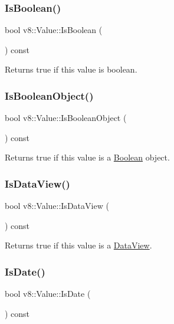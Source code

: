 \subsubsection{\texorpdfstring{Is\+Boolean()}{IsBoolean()}}
{\footnotesize\ttfamily bool v8\+::\+Value\+::\+Is\+Boolean (\begin{DoxyParamCaption}{ }\end{DoxyParamCaption}) const}

Returns true if this value is boolean. \mbox{\label{classv8_1_1Value_a4cc64a2761fa8ed852007a2c35ecde8a}} 
\subsubsection{\texorpdfstring{Is\+Boolean\+Object()}{IsBooleanObject()}}
{\footnotesize\ttfamily bool v8\+::\+Value\+::\+Is\+Boolean\+Object (\begin{DoxyParamCaption}{ }\end{DoxyParamCaption}) const}

Returns true if this value is a \mbox{\hyperlink{classv8_1_1Boolean}{Boolean}} object. \mbox{\label{classv8_1_1Value_ad854ff95b445e924a4d78b1b1dc8054b}} 
\subsubsection{\texorpdfstring{Is\+Data\+View()}{IsDataView()}}
{\footnotesize\ttfamily bool v8\+::\+Value\+::\+Is\+Data\+View (\begin{DoxyParamCaption}{ }\end{DoxyParamCaption}) const}

Returns true if this value is a \mbox{\hyperlink{classv8_1_1DataView}{Data\+View}}. \mbox{\label{classv8_1_1Value_aa94f94744aed4d5e731eacf52c8b4801}} 
\subsubsection{\texorpdfstring{Is\+Date()}{IsDate()}}
{\footnotesize\ttfamily bool v8\+::\+Value\+::\+Is\+Date (\begin{DoxyParamCaption}{ }\end{DoxyParamCaption}) const}

